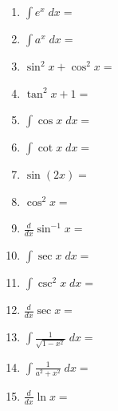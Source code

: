 \documentclass{exam}[12pt]
\begin{document}
\pagestyle{head}

\extrafootheight{-.3in} 

\vspace{.2in}
\large{
\begin{enumerate}
\item $\displaystyle \int e^x \; dx = $
\vspace{.2in}

\item $\displaystyle \int a^x \; dx = $
\vspace{.2in}

\item $\sin^2 x + \cos^2 x = $
\vspace{.15in}

\item $\tan^2 x + 1 = $
\vspace{.15in}

\item   $\displaystyle \int \cos x \; dx = $
\vspace{.2in}
\item $\displaystyle \int \cot x \; dx = $
\vspace{.2in}

\item $\sin(2x) = $
\vspace{.15in}
\item $\displaystyle \cos^2 x = $
\vspace{.15in}

\vspace{.2in}
\item $\displaystyle \frac{d}{dx} \sin^{-1} x = $
\vspace{.2in}

\item $\displaystyle \int \sec x \; dx = $
\vspace{.2in}
\item  $\displaystyle \int \csc^2 x \; dx = $
\vspace{.2in}


\item $\displaystyle \frac{d}{dx} \sec x = $
\vspace{.2in}
\item $\displaystyle \int \frac{1}{\sqrt{1-x^2}} \; dx = $ 
\vspace{.2in}

\item $\displaystyle \int \frac{1}{a^2+x^2}\; dx = $
\vspace{.2in}

\item $\displaystyle \frac{d}{dx} \ln x = $








\end{enumerate}
}
\end{document}
